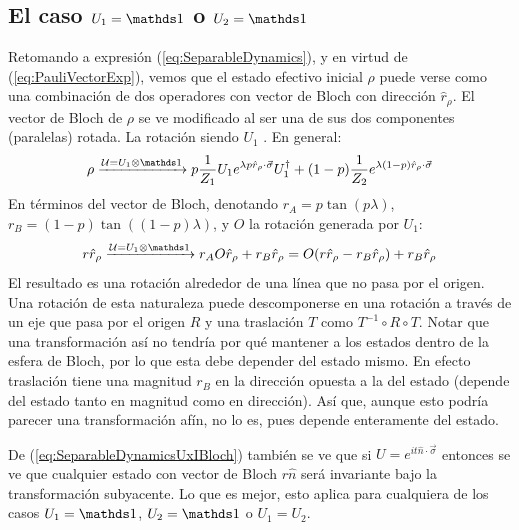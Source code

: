 \subsection{El caso $U_{1}=\Id$ o $U_{2}=\Id$}
Retomando a expresión (\ref{eq:SeparableDynamics}), y en virtud de (\ref{eq:PauliVectorExp}), vemos que el estado efectivo inicial $\rho$ puede verse como una combinación de dos operadores con vector de Bloch con dirección $\hat{r}_{\rho}$. El vector de Bloch de $\rho$ se ve modificado al ser una de sus dos componentes (paralelas) rotada. La rotación siendo $U_{1}$ . En general:
\begin{equation}\label{eq:SeparableDynamicsUxI}
    \rho\xrightarrow{\mcU=U_{1}\otimes \Id} p\frac{1}{Z_{1}}U_{1}e^{\lambda p\hat{r}_{\rho}\cdot\vec{\sigma}}U_{1}^{\dag}+(1-p)\frac{1}{Z_{2}}e^{\lambda(1-p)\hat{r}_{\rho}\cdot\vec{\sigma}}
\end{equation}
En términos del vector de Bloch, denotando $r_{A}=p\tan(p\lambda)$, $r_{B}=(1-p)\tan((1-p)\lambda)$, y $O$ la rotación generada por $U_{1}$:
\begin{equation}
    r\hat{r}_{\rho}\xrightarrow{\mcU=U_{1}\otimes \Id}r_{A}O\hat{r}_{\rho}+r_{B}\hat{r}_{\rho}=O(r\hat{r}_{\rho}-r_{B}\hat{r}_{\rho})+r_{B}\hat{r}_{\rho}
\end{equation}\label{eq:SeparableDynamicsUxIBloch}
El resultado es una rotación alrededor de una línea que no pasa por el origen. Una rotación de esta naturaleza puede descomponerse en una rotación a través de un eje que pasa por el origen $R$ y una traslación $T$ como $T^{-1}\circ R\circ T$. Notar que una transformación así no tendría por qué mantener a los estados dentro de la esfera de Bloch, por lo que esta debe depender del estado mismo. En efecto traslación tiene una magnitud $r_{B}$ en la dirección opuesta a la del estado (depende del estado tanto en magnitud como en dirección). Así que, aunque esto podría parecer una transformación afín, no lo es, pues depende enteramente del estado.

De (\ref{eq:SeparableDynamicsUxIBloch}) también se ve que si $U=e^{it\hat{n}\cdot\vec{\sigma}}$ entonces se ve que cualquier estado con vector de Bloch $r\hat{n}$ será invariante bajo la transformación subyacente. Lo que es mejor, esto aplica para cualquiera de los casos $U_{1}=\Id$, $U_{2}=\Id$ o $U_{1}=U_{2}$.

